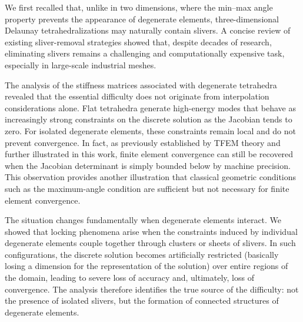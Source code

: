 \documentclass{article}
\begin{document}
We first recalled that, unlike in two dimensions, where the min--max angle property prevents the appearance of degenerate elements, three-dimensional Delaunay tetrahedralizations may naturally contain slivers. A concise review of existing sliver-removal strategies showed that, despite decades of research, eliminating slivers remains a challenging and computationally expensive task, especially in large-scale industrial meshes.

The analysis of the stiffness matrices associated with degenerate tetrahedra revealed that the essential difficulty does not originate from interpolation considerations alone. Flat tetrahedra generate high-energy modes that behave as increasingly strong constraints on the discrete solution as the Jacobian tends to zero. For isolated degenerate elements, these constraints remain local and do not prevent convergence. In fact, as previously established by TFEM theory and further illustrated in this work, finite element convergence can still be recovered when the Jacobian determinant is simply bounded below by machine precision. This observation provides another illustration that classical geometric conditions such as the maximum-angle condition are sufficient but not necessary for finite element convergence.

The situation changes fundamentally when degenerate elements interact. We showed that locking phenomena arise when the constraints induced by individual degenerate elements couple together through clusters or sheets of slivers. In such configurations, the discrete solution becomes artificially restricted (basically losing a dimension for the representation of the solution) over entire regions of the domain, leading to severe loss of accuracy and, ultimately, loss of convergence. The analysis therefore identifies the true source of the difficulty: not the presence of isolated slivers, but the formation of connected structures of degenerate elements.
\end{document}
